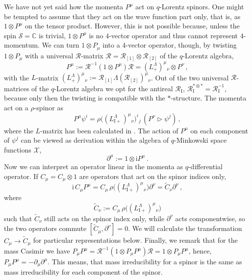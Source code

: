 \documentclass[12pt,a4paper]{article}
\newcommand{\I}{\mathrm{i}}
\newcommand{\tr}{\triangleright}
\newcommand{\R}{\mathcal{R}}
\newcommand{\RI}{ \mathcal{R}_{\mathrm{I}} }
\newcommand{\Xcal}{\mathcal{X}}
\newcommand{\Scal}{\mathcal{S}}
\begin{document}
We have not yet said how the momenta $P^\mu$ act on $q$-Lorentz
spinors. One might be tempted to assume that they act on the wave
function part only, that is, as $1\otimes P^\mu$ on the tensor
product. However, this is not possible because, unless the spin $\Scal
= \mathbb{C}$ is trivial, $1\otimes P^\mu$ is no $4$-vector operator
and thus cannot represent 4-momentum. We can turn $1\otimes P_\mu$
into a 4-vector operator, though, by twisting $1\otimes P_\mu$ with a
universal $\R$-matrix $\R = \R_{[1]} \otimes \R_{[2]}$ of the
$q$-Lorentz algebra,
\begin{equation}
  P^\mu := \R^{-1}(1\otimes P^\mu)\R =
           (L^\Lambda_+)^{\mu}{}_{\nu} \otimes P^{\nu} \,,
\end{equation}
with the $L$-matrix $(L^\Lambda_+)^\mu{}_\nu := \R_{[1]}
\Lambda(\R_{[2]})^\mu{}_\nu$. Out of the two universal $\R$-matrices
of the $q$-Lorentz algebra we opt for the antireal $\RI$,
$\RI^{*\otimes *} = \RI^{-1}$, because only then the twisting is
compatible with the $*$-structure. The momenta act on a $\rho$-spinor
as
\begin{equation}
  P^\mu \psi^i
  = \rho\bigl( (L^\Lambda_{\mathrm{I}+})^{\mu}{}_{\nu}\bigr)^i{}_j
  \,(P^{\nu} \tr \psi^j) \,,
\end{equation}
where the $L$-matrix has been calculated in \cite{Blohmann}. The
action of $P^\mu$ on each component of $\psi^j$ can be viewed as
derivation within the algebra of $q$-Minkowski space functions
$\Xcal$,
\begin{equation}
  \partial^\mu := 1\otimes \I P^\mu \,.
\end{equation}
Now we can interpret an operator linear in the momenta as
$q$-differential operator. If $C_\mu = C_\mu\otimes 1$ are operators
that act on the spinor indices only,
\begin{equation}
  \I\,C_\mu  P^\mu
  = C_\mu\,\rho\bigl( (L^\Lambda_{\mathrm{I}+})^{\mu}{}_{\nu}\bigr)
  \partial^{\nu} = \tilde{C}_{\nu} \partial^{\nu} \,,
\end{equation} 
where
\begin{equation}
\label{eq:Optilde}
  \tilde{C}_{\nu} :=
  C_\mu\,\rho\bigl( (L^\Lambda_{\mathrm{I}+})^{\mu}{}_{\nu}\bigr)
\end{equation}
such that $\tilde{C}_{\nu}$ still acts on the spinor index only, while
$\partial^{\nu}$ acts componentwise, so the two operators commute
$[\tilde{C}_{\mu},\partial^{\nu}] = 0$. We will calculate the
transformation $C_\mu \rightarrow \tilde{C}_\mu$ for particular
representations below. Finally, we remark that for the mass Casimir we
have $P_\mu P^\mu = \R^{-1}(1\otimes P_\mu P^\mu)\R = 1\otimes P_\mu
P^\mu$, hence, $P_\mu P^\mu = - \partial_\mu \partial^\mu$. This
means, that mass irreducibility for a spinor is the same as mass
irreducibility for each component of the spinor.
\end{document}
